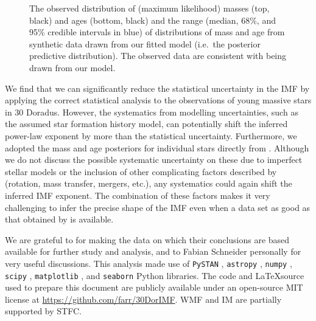 \documentclass[apjl]{emulateapj}
\newcommand{\MSun}{M_\odot}
\begin{document}
\begin{figure}
    		\caption{The observed distribution of (maximum likelihood) masses (top, black) and ages (bottom, black) and the range (median, 68\%, and 95\% credible intervals in blue) of distributions of mass and age from synthetic data drawn from our fitted model (i.e.\ the posterior predictive distribution).  The observed data are consistent with being drawn from our model.  %
		}\label{fig:PPC}
\end{figure}


We find that we can significantly reduce the statistical uncertainty in the IMF by applying the correct statistical analysis to the observations of young massive stars in 30 Doradus.  However, the systematics from modelling uncertainties, such as the assumed star formation history model, can potentially shift the inferred power-law exponent by more than the statistical uncertainty.   Furthermore, we adopted the mass and age posteriors for individual stars directly from \citet{Schneider:2018}.  Although we do not discuss the possible systematic uncertainty on these due to imperfect stellar models or the inclusion of other complicating factors described by \citet{Schneider:2018} (rotation, mass transfer, mergers, etc.), any systematics could again shift the inferred IMF exponent.  
The combination of these factors makes it very challenging to infer the precise shape of the IMF even when a data set as good as that obtained by is \citet{Schneider:2018} available.


\acknowledgments

We are grateful to \citet{Schneider:2018} for making the data on which their conclusions are
based available for further study and analysis, and to Fabian Schneider personally for very useful discussions.  This analysis made use of \texttt{PySTAN} \citep{PySTAN}, \texttt{astropy} \citep{astropy}, \texttt{numpy} \citep{numpy}, \texttt{scipy} \citep{scipy}, \texttt{matplotlib} \citep{matplotlib}, and \texttt{seaborn} \citep{seaborn} Python libraries.  The code and \LaTeX source used to prepare this document are publicly available under an open-source MIT license at \url{https://github.com/farr/30DorIMF}.  WMF and IM are partially supported by STFC.



\end{document}
